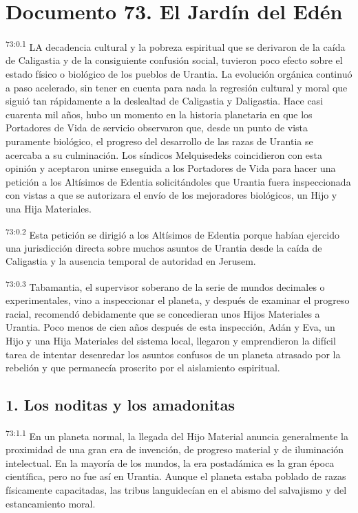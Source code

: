 \chapter{Documento 73. El Jardín del Edén}
\par
\textsuperscript{73:0.1} LA decadencia cultural y la pobreza espiritual que se derivaron de la caída de Caligastia y de la consiguiente confusión social, tuvieron poco efecto sobre el estado físico o biológico de los pueblos de Urantia. La evolución orgánica continuó a paso acelerado, sin tener en cuenta para nada la regresión cultural y moral que siguió tan rápidamente a la deslealtad de Caligastia y Daligastia. Hace casi cuarenta mil años, hubo un momento en la historia planetaria en que los Portadores de Vida de servicio observaron que, desde un punto de vista puramente biológico, el progreso del desarrollo de las razas de Urantia se acercaba a su culminación. Los síndicos Melquisedeks coincidieron con esta opinión y aceptaron unirse enseguida a los Portadores de Vida para hacer una petición a los Altísimos de Edentia solicitándoles que Urantia fuera inspeccionada con vistas a que se autorizara el envío de los mejoradores biológicos, un Hijo y una Hija Materiales.

\par
\textsuperscript{73:0.2} Esta petición se dirigió a los Altísimos de Edentia porque habían ejercido una jurisdicción directa sobre muchos asuntos de Urantia desde la caída de Caligastia y la ausencia temporal de autoridad en Jerusem.

\par
\textsuperscript{73:0.3} Tabamantia, el supervisor soberano de la serie de mundos decimales o experimentales, vino a inspeccionar el planeta, y después de examinar el progreso racial, recomendó debidamente que se concedieran unos Hijos Materiales a Urantia. Poco menos de cien años después de esta inspección, Adán y Eva, un Hijo y una Hija Materiales del sistema local, llegaron y emprendieron la difícil tarea de intentar desenredar los asuntos confusos de un planeta atrasado por la rebelión y que permanecía proscrito por el aislamiento espiritual.

\section*{1. Los noditas y los amadonitas}
\par
\textsuperscript{73:1.1} En un planeta normal, la llegada del Hijo Material anuncia generalmente la proximidad de una gran era de invención, de progreso material y de iluminación intelectual. En la mayoría de los mundos, la era postadámica es la gran época científica, pero no fue así en Urantia. Aunque el planeta estaba poblado de razas físicamente capacitadas, las tribus languidecían en el abismo del salvajismo y del estancamiento moral.

